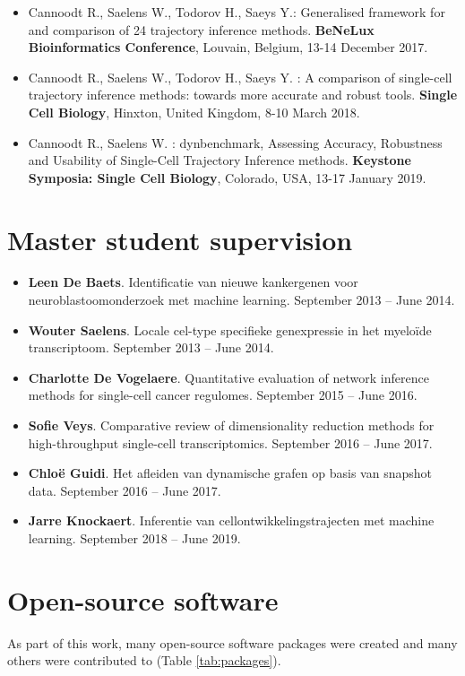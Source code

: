 \begin{itemize}
  \item Cannoodt R., Saelens W., Todorov H., Saeys Y.: Generalised framework for and comparison of 24 trajectory inference methods. \textbf{BeNeLux Bioinformatics Conference}, Louvain, Belgium, 13-14 December 2017.
  \item Cannoodt R., Saelens W., Todorov H., Saeys Y. : A comparison of single-cell trajectory inference methods: towards more accurate and robust tools. \textbf{Single Cell Biology}, Hinxton, United Kingdom, 8-10 March 2018.
  \item Cannoodt R., Saelens W. : dynbenchmark, Assessing Accuracy, Robustness and Usability of Single-Cell Trajectory Inference methods. \textbf{Keystone Symposia: Single Cell Biology}, Colorado, USA, 13-17 January 2019.
\end{itemize}

\section{Master student supervision}

\begin{itemize}
  \item \textbf{Leen De Baets}. Identificatie van nieuwe kankergenen voor neuroblastoomonderzoek met machine learning. September 2013 -- June 2014.
  \item \textbf{Wouter Saelens}. Locale cel-type specifieke genexpressie in het myeloïde transcriptoom. September 2013 -- June 2014.
  \item \textbf{Charlotte De Vogelaere}. Quantitative evaluation of network inference methods for single-cell cancer regulomes. September 2015 -- June 2016.
  \item \textbf{Sofie Veys}. Comparative review of dimensionality reduction methods for high-throughput single-cell transcriptomics. September 2016 -- June 2017.
  \item \textbf{Chloë Guidi}. Het afleiden van dynamische grafen op basis van snapshot data. September 2016 -- June 2017.
  \item \textbf{Jarre Knockaert}. Inferentie van cellontwikkelingstrajecten met machine learning. September 2018 -- June 2019.
\end{itemize}

\section{Open-source software}
As part of this work, many open-source software packages were created and many others were contributed to (Table \ref{tab:packages}). 

